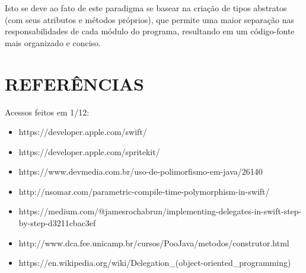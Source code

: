 \documentclass[rel_mlp]{iiufrgs}
\begin{document}
Isto se deve ao fato de este paradigma se basear na criação de tipos abstratos (com seus atributos e métodos próprios), que permite uma maior separação nas responsabilidades de cada módulo do programa, resultando em um código-fonte mais organizado e conciso.


%
\chapter{REFERÊNCIAS}

Acessos feitos em 1/12:

\begin{itemize}
\setlength{\itemindent}{1em}
    \item https://developer.apple.com/swift/
    \item https://developer.apple.com/spritekit/
    \item https://www.devmedia.com.br/uso-de-polimorfismo-em-java/26140
    \item http://nsomar.com/parametric-compile-time-polymorphism-in-swift/
    \item https://medium.com/@jamesrochabrun/implementing-delegates-in-swift-step-by-step-d3211cbac3ef
    \item http://www.dca.fee.unicamp.br/cursos/PooJava/metodos/construtor.html
    \item https://en.wikipedia.org/wiki/Delegation\_(object-oriented\_programming)
\end{itemize}
\end{document}
